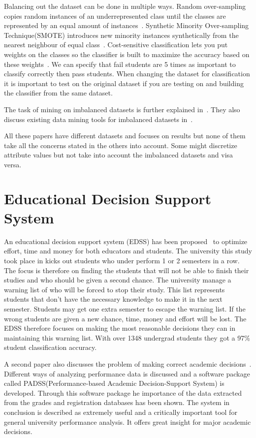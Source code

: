 \bigskip\noindent
Balancing out the dataset can be done in multiple ways. 
Random over-sampling copies random instances of an underrepresented class until the classes are represented by an equal amount of instances~\cite{12}. 
Synthetic Minority Over-sampling Technique(SMOTE) introduces new minority instances synthetically from the nearest neighbour of equal class~\cite{9}. 
Cost-sensitive classification lets you put weights on the classes so the classifier is built to maximize the accuracy based on these weights~\cite{9}. 
We can specify that fail students are 5 times as important to classify correctly then pass students. 
When changing the dataset for classification it is important to test on the original dataset if you are testing on and building the classifier from the same dataset.

\bigskip\noindent
The task of mining on imbalanced datasets is further explained in~\cite{10}.
They also discuss existing data mining tools for imbalanced datasets in~\cite{8}.

\bigskip\noindent
All these papers have different datasets and focuses on results but none of them take all the concerns stated in the others into account. 
Some might discretize attribute values but not take into account the imbalanced datasets and visa versa.

\section{Educational Decision Support System}
An educational decision support system (EDSS) has been proposed~\cite{5} to optimize effort, time and money for both educators and students. 
The university this study took place in kicks out students who under perform 1 or 2 semesters in a row.
The focus is therefore on finding the students that will not be able to finish their studies and who should be given a second chance. 
The university manage a warning list of who will be forced to stop their study. 
This list represents students that don't have the necessary knowledge to make it in the next semester. 
Students may get one extra semester to escape the warning list. 
If the wrong students are given a new chance, time, money and effort will be lost. 
The EDSS therefore focuses on making the most reasonable decisions they can in maintaining this warning list. 
With over 1348 undergrad students they got a 97\% student classification accuracy.

\bigskip\noindent
A second paper also discusses the problem of making correct academic decisions~\cite{6}. 
Different ways of analyzing performance data is discussed and a software package called PADSS(Performance-based Academic Decision-Support System) is developed. 
Through this software package he importance of the data extracted from the grades and registration databases has been shown. 
The system in conclusion is described as extremely useful and a critically important tool for general university performance analysis.
It offers great insight for major academic decisions.